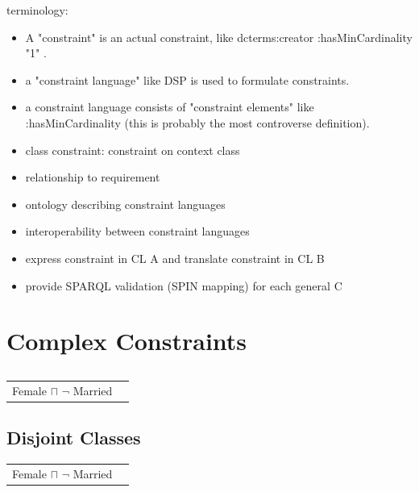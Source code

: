 \documentclass{llncs}
\newenvironment{DL}{
	\begin{center}
  \begin{tabular}{r l}

}{
  \end{tabular}
	\end{center}
}
\begin{document}
terminology:
\begin{itemize}
	\item A "constraint" is an actual constraint, like dcterms:creator :hasMinCardinality "1" .
  \item a "constraint language" like DSP is used to formulate constraints.
  \item a constraint language consists of "constraint elements" like :hasMinCardinality (this is probably the most controverse definition).
	\item class constraint: constraint on context class
\end{itemize}

\begin{itemize}
	\item relationship to requirement
  \item ontology describing constraint languages
	\item interoperability between constraint languages
  \item express constraint in CL A and translate constraint in CL B
  \item provide SPARQL validation (SPIN mapping) for each general C 
\end{itemize}

\section{Complex Constraints}

\subsection{}

\begin{DL}
Female $\sqcap$ $\neg$ Married \\
\end{DL}

\subsection{Disjoint Classes}

\begin{DL}
Female $\sqcap$ $\neg$ Married \\
\end{DL}

{}

\setcounter{tocdepth}{1}
\end{document}
